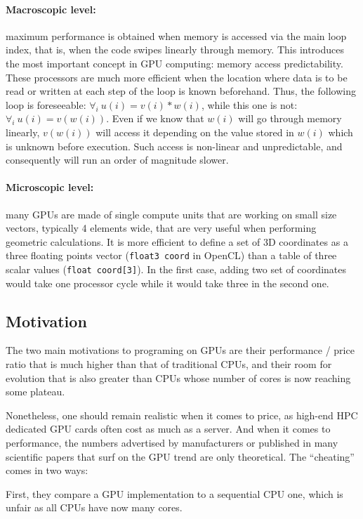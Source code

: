 \documentclass[a4paper,12pt]{article}
\begin{document}
\paragraph{Macroscopic level:} maximum performance is obtained when memory is accessed via the main loop index, that is, when the code swipes linearly through memory. This introduces the most important concept in GPU computing: memory access predictability. These processors are much more efficient when the location where data is to be read or written at each step of the loop is known beforehand. Thus, the following loop is foreseeable: $\forall_{i} ~u(i)=v(i)*w(i)$, while this one is not:$\forall_{i} ~u(i)=v(w(i))$. Even if we know that $w(i)$ will go through memory linearly, $v(w(i))$ will access it depending on the value stored in $w(i)$ which is unknown before execution. Such access is non-linear and unpredictable, and consequently will run an order of magnitude slower.

\paragraph{Microscopic level:} many GPUs are made of single compute units that are working on small size vectors, typically 4 elements wide, that are very useful when performing geometric calculations. It is more efficient to define a set of 3D coordinates as a three floating points vector ({\tt float3 coord} in OpenCL) than a table of three scalar values ({\tt float coord[3]}). In the first case, adding two set of coordinates would take one processor cycle while it would take three in the second one.


\subsection{Motivation}
The two main motivations to programing on GPUs are their performance / price ratio that is much higher than that of traditional CPUs, and their room for evolution that is also greater than CPUs whose number of cores is now reaching some plateau.

Nonetheless, one should remain realistic when it comes to price, as high-end HPC dedicated GPU cards often cost as much as a server. And when it comes to performance, the numbers advertised by manufacturers or published in many scientific papers that surf on the GPU trend are only theoretical.
The ``cheating'' comes in two ways:

First, they compare a GPU implementation to a sequential CPU one, which is unfair as all CPUs have now many cores.
\end{document}

